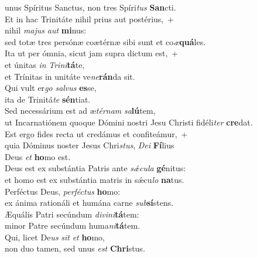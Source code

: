 \oddverse unus Spíritus Sanctus, non tres Spíri\textit{tus} \textbf{San}cti.\\
\evenverse Et in hac Trinitáte nihil prius aut postérius,~+\\
\evenverse  nihil \textit{ma}\textit{jus} \textit{aut} \textbf{mi}nus:~\*\\
\evenverse sed totæ tres persónæ coætérnæ sibi sunt et co\textit{æ}\textbf{quá}les.\\
\oddverse Ita ut per ómnia, sicut jam supra dictum est,~+\\
\oddverse  et únitas \textit{in} \textit{Tri}\textit{ni}\textbf{tá}te,~\*\\
\oddverse et Trínitas in unitáte ve\textit{ne}\textbf{rán}da sit.\\
\evenverse Qui vult er\textit{go} \textit{sal}\textit{vus} \textbf{es}se,~\*\\
\evenverse ita de Trinitá\textit{te} \textbf{sén}tiat.\\
\oddverse Sed necessárium est ad æ\textit{tér}\textit{nam} \textit{sa}\textbf{lú}tem,~\*\\
\oddverse ut Incarnatiónem quoque Dómini nostri Jesu Christi fidéli\textit{ter} \textbf{cre}dat.\\
\evenverse Est ergo fides recta ut credámus et confiteámur,~+\\
\evenverse  quia Dóminus noster Jesus Chri\textit{stus}, \textit{De}\textit{i} \textbf{Fí}lius~\*\\
\evenverse Deus \textit{et} \textbf{ho}mo est.\\
\oddverse Deus est ex substántia Patris ante \textit{sǽ}\textit{cu}\textit{la} \textbf{gé}nitus:~\*\\
\oddverse et homo est ex substántia matris in sǽcu\textit{lo} \textbf{na}tus.\\
\evenverse Perféctus Deus, \textit{per}\textit{fé}\textit{ctus} \textbf{ho}mo:~\*\\
\evenverse ex ánima rationáli et humána carne \textit{sub}\textbf{sí}stens.\\
\oddverse Æquális Patri secúndum \textit{di}\textit{vi}\textit{ni}\textbf{tá}tem:~\*\\
\oddverse minor Patre secúndum huma\textit{ni}\textbf{tá}tem.\\
\evenverse Qui, licet De\textit{us} \textit{sit} \textit{et} \textbf{ho}mo,~\*\\
\evenverse non duo tamen, sed unus \textit{est} \textbf{Chri}stus.\\
